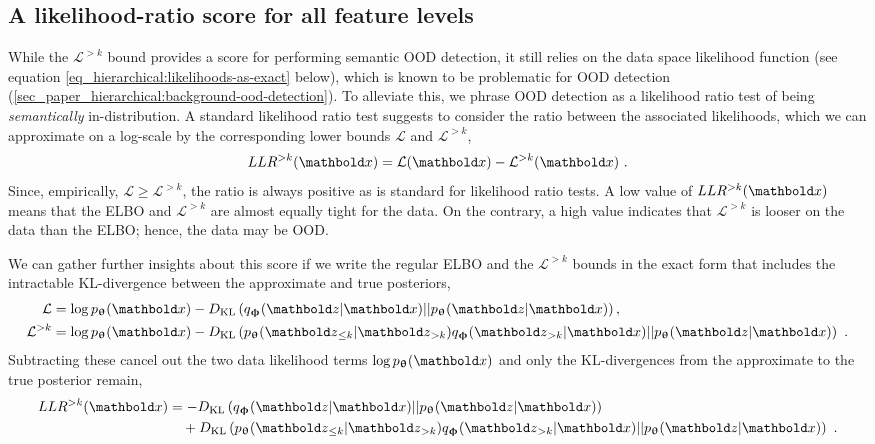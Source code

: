 {\subsection{A likelihood-ratio score for all feature levels}
While the $\mathcal{L}^{>k}$ bound provides a score for performing semantic OOD detection, it still relies on the data space likelihood function (see equation \cref{eq_hierarchical:likelihoods-as-exact} below), which is known to be problematic for OOD detection (\cref{sec_paper_hierarchical:background-ood-detection}). To alleviate this, we phrase OOD detection as a likelihood ratio test of being \emph{semantically} in-distribution.
A standard likelihood ratio test \cite{buse_likelihood_1982} suggests to consider the ratio between the associated likelihoods, which we can approximate on a log-scale by the corresponding lower bounds $\mathcal{L}$ and $\mathcal{L}^{>k}$,
\begin{equation}\label{eq_hierarchical:llr-as-difference-in-likelihoods}
    LLR^{>k}(\xb) = \mathcal{L}(\xb) - \mathcal{L}^{>k}(\xb) \ .
\end{equation}
Since, empirically, $\mathcal{L}\geq\mathcal{L}^{>k}$, the ratio is always positive as is standard for likelihood ratio tests.
A low value of $LLR^{>k}(\xb)$ means that the ELBO and $\mathcal{L}^{>k}$ are almost equally tight for the data.
On the contrary, a high value indicates that $\mathcal{L}^{>k}$ is looser on the data than the ELBO; hence, the data may be OOD.


We can gather further insights about this score if we write the regular ELBO and the $\mathcal{L}^{>k}$ bounds in the exact form that includes the intractable KL-divergence between the approximate and true posteriors,
\begin{align}
    \mathcal{L}      &= \log p_\thetab(\xb) - D_{\mathrm{KL}}\left( q_\phib(\zb|\xb) || p_\thetab(\zb|\xb)\right), \label{eq_hierarchical:likelihoods-as-exact} \\ 
    \mathcal{L}^{>k} &= \log p_\thetab(\xb) - D_{\mathrm{KL}}\left( p_\thetab(\zb_{\leq k }|\zb_{>k}) q_\phib(\zb_{>k}|\xb) || p_\thetab(\zb|\xb)\right) \nonumber \ .
\end{align}
Subtracting these cancel out the two data likelihood terms $\log p_\thetab(\xb)$ and only the KL-divergences from the approximate to the true posterior remain,
\begin{align}
    LLR^{>k}(\xb) &= - D_{\mathrm{KL}}\left( q_\phib(\zb|\xb) || p_\thetab(\zb|\xb)\right) \\
                 &\quad + D_{\mathrm{KL}}\left( p_\thetab(\zb_{\leq k}|\zb_{>k}) q_\phib(\zb_{>k}|\xb) || p_\thetab(\zb|\xb)\right) \ . \notag
\end{align}\label{eq_hierarchical:llr-as-kls}

}
